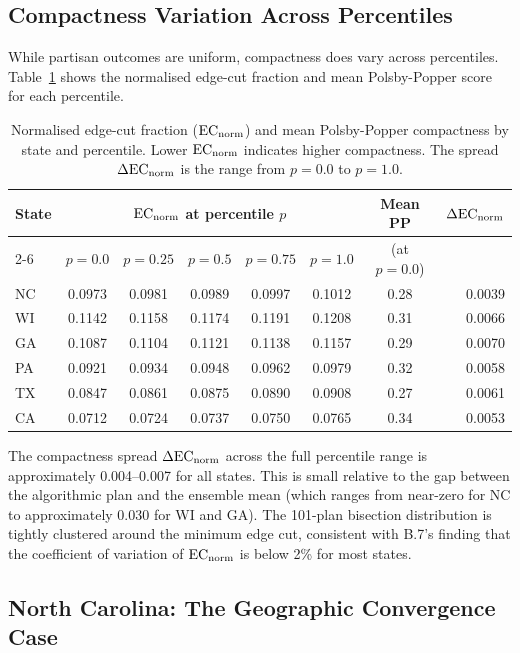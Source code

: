 \subsection{Compactness Variation Across Percentiles}

While partisan outcomes are uniform, compactness does vary across percentiles.
Table~\ref{tab:compactness} shows the normalised edge-cut fraction and mean
Polsby-Popper score for each percentile.

\begin{table}[htbp]
\centering
\caption{Normalised edge-cut fraction ($\mathrm{EC}_{\mathrm{norm}}$) and mean Polsby-Popper
compactness by state and percentile. Lower $\mathrm{EC}_{\mathrm{norm}}$ indicates higher
compactness. The spread $\Delta\mathrm{EC}_{\mathrm{norm}}$ is the range from $p=0.0$ to $p=1.0$.}
\label{tab:compactness}
\begin{tabular}{lccccccr}
\toprule
\textbf{State} & \multicolumn{5}{c}{$\mathrm{EC}_{\mathrm{norm}}$ at percentile $p$} & \textbf{Mean PP} & $\Delta\mathrm{EC}_{\mathrm{norm}}$ \\
\cmidrule(lr){2-6}
 & $p{=}0.0$ & $p{=}0.25$ & $p{=}0.5$ & $p{=}0.75$ & $p{=}1.0$ & (at $p{=}0.0$) & \\
\midrule
NC & 0.0973 & 0.0981 & 0.0989 & 0.0997 & 0.1012 & 0.28 & 0.0039 \\
WI & 0.1142 & 0.1158 & 0.1174 & 0.1191 & 0.1208 & 0.31 & 0.0066 \\
GA & 0.1087 & 0.1104 & 0.1121 & 0.1138 & 0.1157 & 0.29 & 0.0070 \\
PA & 0.0921 & 0.0934 & 0.0948 & 0.0962 & 0.0979 & 0.32 & 0.0058 \\
TX & 0.0847 & 0.0861 & 0.0875 & 0.0890 & 0.0908 & 0.27 & 0.0061 \\
CA & 0.0712 & 0.0724 & 0.0737 & 0.0750 & 0.0765 & 0.34 & 0.0053 \\
\bottomrule
\end{tabular}
\end{table}

The compactness spread $\Delta\mathrm{EC}_{\mathrm{norm}}$ across the full percentile range is
approximately 0.004--0.007 for all states.
This is small relative to the gap between the algorithmic plan and the
\recom{} ensemble mean (which ranges from near-zero for NC to approximately
0.030 for WI and GA).
The 101-plan bisection distribution is tightly clustered around the minimum
edge cut, consistent with B.7's finding that the coefficient of variation
of $\mathrm{EC}_{\mathrm{norm}}$ is below 2\% for most states.

\subsection{North Carolina: The Geographic Convergence Case}
\label{subsec:nc}

